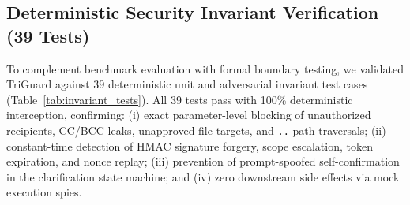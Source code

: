 \documentclass[conference]{IEEEtran}
\begin{document}
\subsection{Deterministic Security Invariant Verification (39 Tests)}
To complement benchmark evaluation with formal boundary testing, we validated TriGuard against 39 deterministic unit and adversarial invariant test cases (Table~\ref{tab:invariant_tests}). All 39 tests pass with 100\% deterministic interception, confirming: (i) exact parameter-level blocking of unauthorized recipients, CC/BCC leaks, unapproved file targets, and \texttt{..} path traversals; (ii) constant-time detection of HMAC signature forgery, scope escalation, token expiration, and nonce replay; (iii) prevention of prompt-spoofed self-confirmation in the clarification state machine; and (iv) zero downstream side effects via mock execution spies.
\end{document}
